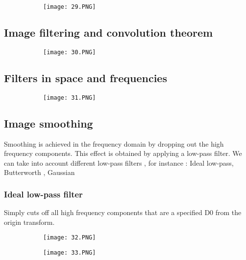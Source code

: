 \documentclass{article}
\begin{document}
 \begin{figure}[ht!]
  \centering
  \begin{subfigure}[b]{0.6\linewidth}
    \texttt{[image: 29.PNG]}
  \end{subfigure}
\end{figure}


\subsection{Image filtering and convolution theorem}
 
 \begin{figure}[ht!]
  \centering
  \begin{subfigure}[b]{0.7\linewidth}
    \texttt{[image: 30.PNG]}
  \end{subfigure}
\end{figure}

\subsection{Filters in space and frequencies}

 \begin{figure}[ht!]
  \centering
  \begin{subfigure}[b]{0.4\linewidth}
    \texttt{[image: 31.PNG]}
  \end{subfigure}
\end{figure}

\subsection{Image smoothing}

Smoothing is achieved in the frequency domain by dropping out the high frequency components. This effect is obtained by applying a low-pass filter.
We can take into account different low-pass filters , for instance : Ideal low-pass, Butterworth , Gaussian

\subsubsection{Ideal low-pass filter}

Simply cuts off all high frequency components that are a specified D0 from the origin transform.


 \begin{figure}[ht!]
  \centering
  \begin{subfigure}[b]{0.69\linewidth}
    \texttt{[image: 32.PNG]}
  \end{subfigure}
     \begin{subfigure}[b]{0.3\textwidth}
         \centering
         \texttt{[image: 33.PNG]}
     \end{subfigure}
\end{figure}
\end{document}

